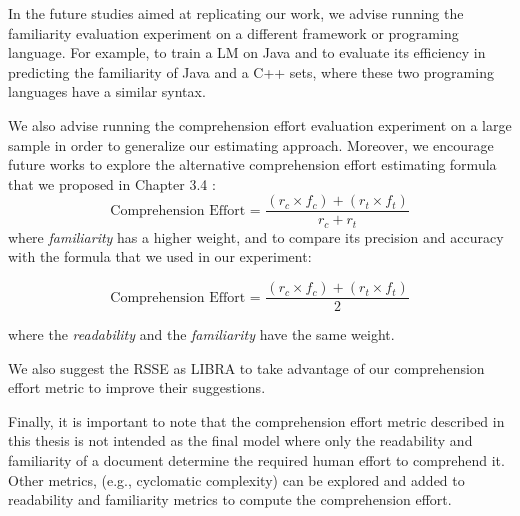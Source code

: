 \documentclass[12pt,mscthesis]{usiinfthesis}
\begin{document}
{In the future studies aimed at replicating our work, we advise running the familiarity evaluation experiment on a different framework or programing language. For example, to train a LM on Java and to evaluate its efficiency in predicting the familiarity of Java and a C++ sets, where these two programing languages have a similar syntax. 


We also advise running the comprehension effort evaluation experiment on a large sample in order to generalize our estimating approach. Moreover, we encourage future works to explore the alternative comprehension effort estimating formula that we proposed in Chapter 3.4 :
 \[\text{Comprehension Effort = }\frac{(r_{c}\times f_{c}) + (r_{t} \times f_{t})}{r_c+r_t} \] 
where \emph{familiarity} has a higher weight, and to compare its precision and accuracy with the formula that we used in our experiment:

 \[\text{Comprehension Effort = }\frac{(r_{c}\times f_{c}) + (r_{t} \times f_{t})}{2} \]
 
where the \emph{readability} and the \emph{familiarity} have the same weight.


We also suggest the RSSE as LIBRA to take advantage of our comprehension effort metric to improve their suggestions.

Finally, it is important to note that the comprehension effort metric described in this thesis is not intended as the final model where only the readability and familiarity of a document determine the 
required human effort to comprehend it. Other metrics, (e.g., cyclomatic complexity) can be explored and added to readability and familiarity metrics to compute the comprehension effort.








}
\end{document}
